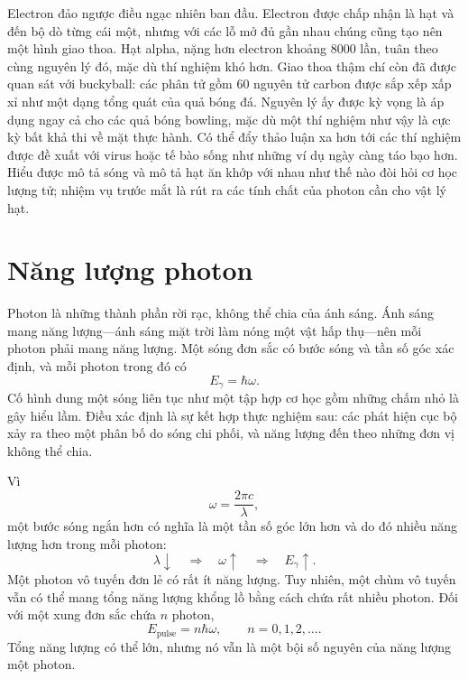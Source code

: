 Electron đảo ngược điều ngạc nhiên ban đầu. Electron được chấp nhận là hạt và đến bộ dò từng cái một, nhưng với các lỗ mở đủ gần nhau chúng cũng tạo nên một hình giao thoa. Hạt alpha, nặng hơn electron khoảng 8000 lần, tuân theo cùng nguyên lý đó, mặc dù thí nghiệm khó hơn. Giao thoa thậm chí còn đã được quan sát với buckyball: các phân tử gồm 60 nguyên tử carbon được sắp xếp xấp xỉ như một dạng tổng quát của quả bóng đá. Nguyên lý ấy được kỳ vọng là áp dụng ngay cả cho các quả bóng bowling, mặc dù một thí nghiệm như vậy là cực kỳ bất khả thi về mặt thực hành. Có thể đẩy thảo luận xa hơn tới các thí nghiệm được đề xuất với virus hoặc tế bào sống như những ví dụ ngày càng táo bạo hơn. Hiểu được mô tả sóng và mô tả hạt ăn khớp với nhau như thế nào đòi hỏi cơ học lượng tử; nhiệm vụ trước mắt là rút ra các tính chất của photon cần cho vật lý hạt.

\section{Năng lượng photon}

Photon là những thành phần rời rạc, không thể chia của ánh sáng. Ánh sáng mang năng lượng---ánh sáng mặt trời làm nóng một vật hấp thụ---nên mỗi photon phải mang năng lượng. Một sóng đơn sắc có bước sóng và tần số góc xác định, và mỗi photon trong đó có
\begin{equation}
E_\gamma=\hbar\omega.
\end{equation}
Cố hình dung một sóng liên tục như một tập hợp cơ học gồm những chấm nhỏ là gây hiểu lầm. Điều xác định là sự kết hợp thực nghiệm sau: các phát hiện cục bộ xảy ra theo một phân bố do sóng chi phối, và năng lượng đến theo những đơn vị không thể chia.

Vì
\begin{equation}
\omega=\frac{2\pi c}{\lambda},
\end{equation}
một bước sóng ngắn hơn có nghĩa là một tần số góc lớn hơn và do đó nhiều năng lượng hơn trong mỗi photon:
\begin{equation}
\lambda\downarrow
\quad\Longrightarrow\quad
\omega\uparrow
\quad\Longrightarrow\quad
E_\gamma\uparrow.
\end{equation}
Một photon vô tuyến đơn lẻ có rất ít năng lượng. Tuy nhiên, một chùm vô tuyến vẫn có thể mang tổng năng lượng khổng lồ bằng cách chứa rất nhiều photon. Đối với một xung đơn sắc chứa \(n\) photon,
\begin{equation}
E_{\text{pulse}}=n\hbar\omega,
\qquad
n=0,1,2,\ldots.
\end{equation}
Tổng năng lượng có thể lớn, nhưng nó vẫn là một bội số nguyên của năng lượng một photon.

